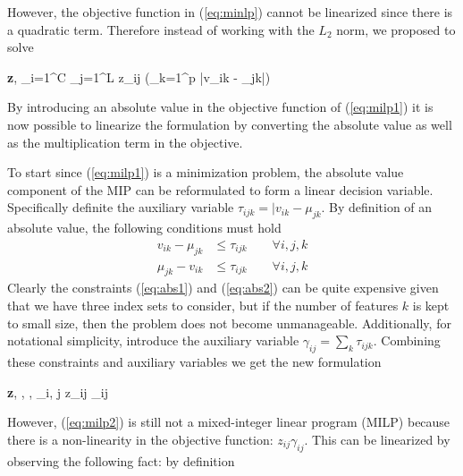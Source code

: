 \documentclass[../thesis.tex]{subfiles}
\begin{document}
However, the objective function in (\ref{eq:minlp}) cannot be linearized since there is a quadratic term. Therefore instead of working with the $L_2$ norm, we proposed to solve
\begin{mini!}
	{\textbf{z}, \boldsymbol{\mu}}{\sum_{i=1}^C \sum_{j=1}^L z_{ij} \left(\sum_{k=1}^p |v_{ik} - \mu_{jk}|\right)}
	{\label{eq:milp1}}{}
\end{mini!}
By introducing an absolute value in the objective function of (\ref{eq:milp1}) it is now possible to linearize the formulation by converting the absolute value as well as the multiplication term in the objective.

To start since (\ref{eq:milp1}) is a minimization problem, the absolute value component of the MIP can be reformulated to form a linear decision variable. Specifically definite the auxiliary variable $\tau_{ijk} = |v_{ik} - \mu_{jk}$. By definition of an absolute value, the following conditions must hold
\begin{align}
    v_{ik} - \mu_{jk} &\leq \tau_{ijk} \quad \quad \forall i, j, k \label{eq:abs1} \\
    \mu_{jk} - v_{ik} &\leq \tau_{ijk} \quad \quad \forall i, j, k \label{eq:abs2}
\end{align}
Clearly the constraints (\ref{eq:abs1}) and (\ref{eq:abs2}) can be quite expensive given that we have three index sets to consider, but if the number of features $k$ is kept to small size, then the problem does not become unmanageable. Additionally, for notational simplicity, introduce the auxiliary variable $\gamma_{ij} = \sum_k \tau_{ijk}$. Combining these constraints and auxiliary variables we get the new formulation
\begin{mini!}
	{\textbf{z}, \boldsymbol{\mu}, \boldsymbol{\tau}, \boldsymbol{\gamma}}{\sum_{i, j} z_{ij} \gamma_{ij}}
	{\label{eq:milp2}}{}
\end{mini!}
However, (\ref{eq:milp2}) is still not a mixed-integer linear program (MILP) because there is a non-linearity in the objective function: $z_{ij} \gamma_{ij}$. This can be linearized by observing the following fact: by definition
\end{document}
